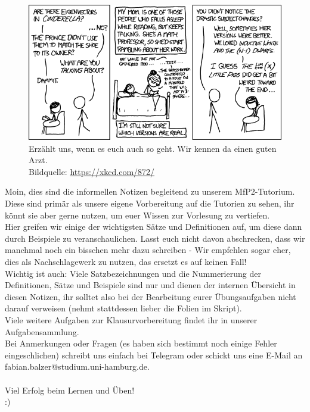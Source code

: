 \begin{figure}[htbp]
    \centering
    \includegraphics[width=.55\textwidth]{Dateien/00xkcd.png}\\
    Erzählt uns, wenn es euch auch so geht. Wir kennen da einen guten Arzt.\\
    Bildquelle: \url{https://xkcd.com/872/}
\end{figure}
\vfill
Moin, dies sind die informellen Notizen begleitend zu unserem MfP2-Tutorium.\\
Diese sind primär als unsere eigene Vorbereitung auf die Tutorien zu sehen, ihr könnt sie aber gerne nutzen, um euer Wissen zur Vorlesung zu vertiefen.\\
Hier greifen wir einige der wichtigsten Sätze und Definitionen auf, um diese dann durch Beispiele zu veranschaulichen. Lasst euch nicht davon abschrecken, dass wir manchmal noch ein bisschen mehr dazu schreiben - Wir empfehlen sogar eher, dies als Nachschlagewerk zu nutzen, das \Skript{} ersetzt es auf keinen Fall!\\
Wichtig ist auch: Viele Satzbezeichnungen und die Nummerierung der Definitionen, Sätze und Beispiele sind nur  und dienen der internen Übersicht in diesen Notizen, ihr solltet also bei der Bearbeitung eurer Übungsaufgaben nicht darauf verweisen (nehmt stattdessen lieber die Folien im Skript).\\
Viele weitere Aufgaben zur Klausurvorbereitung findet ihr in unserer Aufgabensammlung.\\
Bei Anmerkungen oder Fragen (es haben sich bestimmt noch einige Fehler eingeschlichen) schreibt uns einfach bei Telegram oder schickt uns eine E-Mail an fabian.balzer@studium.uni-hamburg.de.\\\\
Viel Erfolg beim Lernen und Üben!\\
:)
\cfoot{\pagemark}

